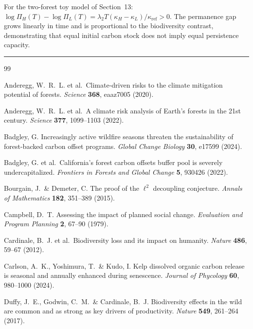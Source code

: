 \documentclass[12pt]{article}
\begin{document}
For the two-forest toy model of Section~13:
$\log\Pi_H(T)-\log\Pi_L(T) = \lambda_2 T(\kappa_H-\kappa_L)/\kappa_\text{ref} > 0$.
The permanence gap grows linearly in time and is proportional to the biodiversity contrast,
demonstrating that equal initial carbon stock does not imply equal persistence capacity.

\bigskip
\noindent\rule{\linewidth}{0.4pt}
\bigskip



\begin{thebibliography}{99}

Anderegg, W.~R.~L. et al.\ Climate-driven risks to the climate mitigation potential of forests. \textit{Science} \textbf{368}, eaaz7005 (2020).

Anderegg, W.~R.~L. et al.\ A climate risk analysis of Earth's forests in the 21st century. \textit{Science} \textbf{377}, 1099--1103 (2022).

Badgley, G. Increasingly active wildfire seasons threaten the sustainability of forest-backed carbon offset programs. \textit{Global Change Biology} \textbf{30}, e17599 (2024).

Badgley, G. et al.\ California's forest carbon offsets buffer pool is severely undercapitalized. \textit{Frontiers in Forests and Global Change} \textbf{5}, 930426 (2022).

Bourgain, J.\ \& Demeter, C. The proof of the $\ell^2$ decoupling conjecture. \textit{Annals of Mathematics} \textbf{182}, 351--389 (2015).

Campbell, D.~T. Assessing the impact of planned social change. \textit{Evaluation and Program Planning} \textbf{2}, 67--90 (1979).

Cardinale, B.~J. et al.\ Biodiversity loss and its impact on humanity. \textit{Nature} \textbf{486}, 59--67 (2012).

Carlson, A.~K., Yoshimura, T.\ \& Kudo, I. Kelp dissolved organic carbon release is seasonal and annually enhanced during senescence. \textit{Journal of Phycology} \textbf{60}, 980--1000 (2024).

Duffy, J.~E., Godwin, C.~M.\ \& Cardinale, B.~J. Biodiversity effects in the wild are common and as strong as key drivers of productivity. \textit{Nature} \textbf{549}, 261--264 (2017).


\end{thebibliography}
\end{document}
